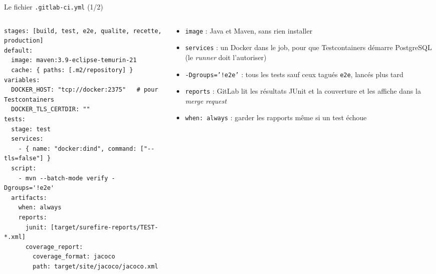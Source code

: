 \documentclass[aspectratio=169,10pt]{beamer}
\begin{document}
\begin{frame}[fragile]{Le fichier \texttt{.gitlab-ci.yml} (1/2)}
  \begin{columns}[T]
    \begin{column}{0.6\textwidth}
\begin{lstlisting}[style=yml]
stages: [build, test, e2e, qualite, recette, production]
default:
  image: maven:3.9-eclipse-temurin-21
  cache: { paths: [.m2/repository] }
variables:
  DOCKER_HOST: "tcp://docker:2375"   # pour Testcontainers
  DOCKER_TLS_CERTDIR: ""
tests:
  stage: test
  services:
    - { name: "docker:dind", command: ["--tls=false"] }
  script:
    - mvn --batch-mode verify -Dgroups='!e2e'
  artifacts:
    when: always
    reports:
      junit: [target/surefire-reports/TEST-*.xml]
      coverage_report:
        coverage_format: jacoco
        path: target/site/jacoco/jacoco.xml
\end{lstlisting}
    \end{column}
    \begin{column}{0.37\textwidth}
      \small
      \begin{itemize}
        \item \texttt{image} : Java et Maven, sans rien installer
        \item \texttt{services} : un Docker dans le job, pour que Testcontainers démarre PostgreSQL (le \textit{runner} doit l'autoriser)
        \item \texttt{-Dgroups='!e2e'} : tous les tests sauf ceux tagués \texttt{e2e}, lancés plus tard
        \item \texttt{reports} : GitLab lit les résultats JUnit et la couverture et les affiche dans la \textit{merge request}
        \item \texttt{when: always} : garder les rapports même si un test échoue
      \end{itemize}
    \end{column}
  \end{columns}
\end{frame}
\end{document}
